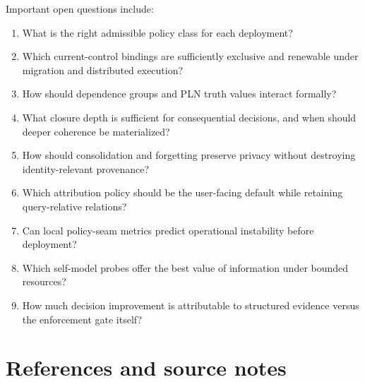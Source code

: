 \documentclass[11pt,oneside]{report}
\begin{document}
Important open questions include:

\begin{enumerate}
  \item What is the right admissible policy class for each deployment?
  \item Which current-control bindings are sufficiently exclusive and renewable under migration and distributed execution?
  \item How should dependence groups and PLN truth values interact formally?
  \item What closure depth is sufficient for consequential decisions, and when should deeper coherence be materialized?
  \item How should consolidation and forgetting preserve privacy without destroying identity-relevant provenance?
  \item Which attribution policy should be the user-facing default while retaining query-relative relations?
  \item Can local policy-seam metrics predict operational instability before deployment?
  \item Which self-model probes offer the best value of information under bounded resources?
  \item How much decision improvement is attributable to structured evidence versus the enforcement gate itself?
\end{enumerate}

\chapter{References and source notes}
\end{document}
